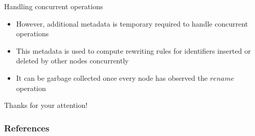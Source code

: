 \documentclass[10pt]{beamer}
\begin{document}
\begin{frame}{Handling concurrent operations}
  \begin{itemize}
    \item However, additional metadata is temporary required to handle concurrent operations
    \item This metadata is used to compute rewriting rules for identifiers inserted or deleted by other nodes concurrently
    \item It can be garbage collected once every node has observed the $rename$ operation
  \end{itemize}
\end{frame}


\begin{frame}[standout]
  Thanks for your attention!
  \vspace{3em}
  \begin{center}
    \ccby
  \end{center}
\end{frame}

\begin{frame}[allowframebreaks]
  \frametitle{References}
  
  
\end{frame}
\end{document}
